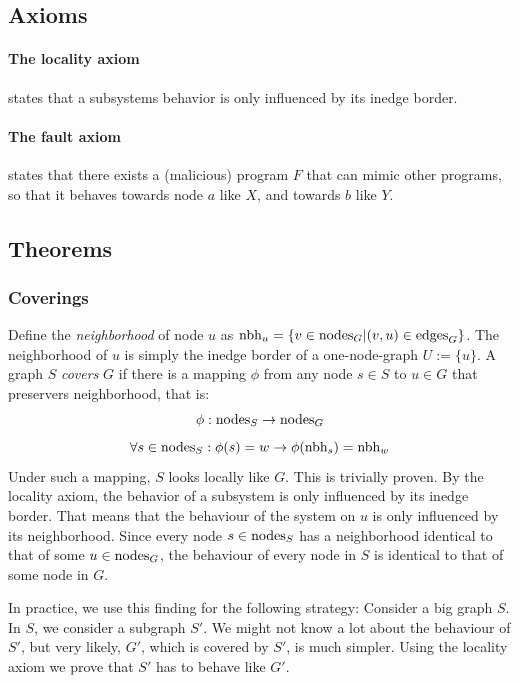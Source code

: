 \subsection{Axioms}
\paragraph{The locality axiom} states that a subsystems behavior is only influenced by its inedge border.
\paragraph{The fault axiom} states that there exists a (malicious) program $F$ that can mimic other programs, so that it behaves towards node $a$ like $X$, and towards $b$ like $Y$. 

\subsection{Theorems}

\subsubsection{Coverings}
Define the \emph{neighborhood} of node $u$ as $\text{nbh}_u = \{ v \in  \text{nodes}_{G}  | (v, u) \in  \text{edges}_{G}  \}$. The neighborhood of $u$ is simply the inedge border of a one-node-graph $U := \{u\}$. A graph $S$ \emph{covers} $G$ if there is a mapping $\phi$ from any node $s \in S$ to $u \in G$ that preservers neighborhood, that is: 
$$ \phi:  \text{nodes}_{S}  \to  \text{nodes}_{G}  $$
$$ \forall s \in  \text{nodes}_{S} : \phi(s) = w \to \phi( \text{nbh}_s ) = \text{nbh}_w $$
Under such a mapping, $S$ looks locally like $G$. This is trivially proven. By the locality axiom, the behavior of a subsystem is only influenced by its inedge border. That means that the behaviour of the system on $u$ is only influenced by its neighborhood. Since every node $s \in  \text{nodes}_{S} $ has a neighborhood identical to that of some $u \in  \text{nodes}_{G} $, the behaviour of every node in $S$ is identical to that of some node in $G$.

In practice, we use this finding for the following strategy: Consider a big graph $S$. In $S$, we consider a subgraph $S'$. We might not know a lot about the behaviour of $S'$, but very likely, $G'$, which is covered by $S'$, is much simpler. Using the locality axiom we prove that $S'$ has to behave like $G'$.

